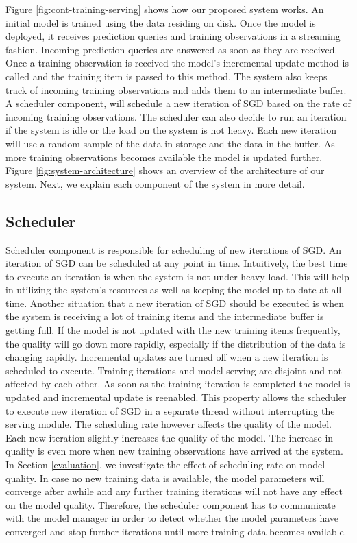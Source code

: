 \documentclass{vldb}
\begin{document}
Figure \ref{fig:cont-training-serving} shows how our proposed system works.
An initial model is trained using the data residing on disk.
Once the model is deployed, it receives prediction queries and training observations in a streaming fashion.
Incoming prediction queries are answered as soon as they are received.
Once a training observation is received the model's incremental update method is called and the training item is passed to this method.
The system also keeps track of incoming training observations and adds them to an intermediate buffer.
A scheduler component, will schedule a new iteration of SGD based on the rate of incoming training observations. 
The scheduler can also decide to run an iteration if the system is idle or the load on the system is not heavy. 
Each new iteration will use a random sample of the data in storage and the data in the buffer. 
As more training observations becomes available the model is updated further.
Figure \ref{fig:system-architecture} shows an overview of the architecture of our system.
Next, we explain each component of the system in more detail.

\subsection{Scheduler}\label{scheduler}
Scheduler component is responsible for scheduling of new iterations of SGD.
An iteration of SGD can be scheduled at any point in time.
Intuitively, the best time to execute an iteration is when the system is not under heavy load.
This will help in utilizing the system's resources as well as keeping the model up to date at all time.
Another situation that a new iteration of SGD should be executed is when the system is receiving a lot of training items and the intermediate buffer is getting full.
If the model is not updated with the new training items frequently, the quality will go down more rapidly, especially if the distribution of the data is changing rapidly.
Incremental updates are turned off when a new iteration is scheduled to execute.
Training iterations and model serving are disjoint and not affected by each other.
As soon as the training iteration is completed the model is updated and incremental update is reenabled.
This property allows the scheduler to execute new iteration of SGD in a separate thread without interrupting the serving module.
The scheduling rate however affects the quality of the model.
Each new iteration slightly increases the quality of the model.
The increase in quality is even more when new training observations have arrived at the system.
In Section \ref{evaluation}, we investigate the effect of scheduling rate on model quality.
In case no new training data is available, the model parameters will converge after awhile and any further training iterations will not have any effect on the model quality.
Therefore, the scheduler component has to communicate with the model manager in order to detect whether the model parameters have converged and stop further iterations until more training data becomes available.
\end{document}
